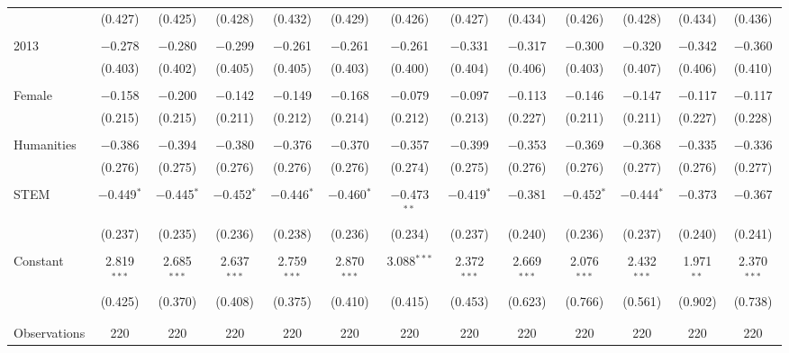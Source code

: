 \begin{subtables}
\begin{table}[H]
\begin{adjustbox}{width=\textwidth}
\begin{tabular}{@{\extracolsep{5pt}}lcccccccccccc}
  & (0.427) & (0.425) & (0.428) & (0.432) & (0.429) & (0.426) & (0.427) & (0.434) & (0.426) & (0.428) & (0.434) & (0.436) \\ 
  & & & & & & & & & & & & \\ 
 2013 & $-$0.278 & $-$0.280 & $-$0.299 & $-$0.261 & $-$0.261 & $-$0.261 & $-$0.331 & $-$0.317 & $-$0.300 & $-$0.320 & $-$0.342 & $-$0.360 \\ 
  & (0.403) & (0.402) & (0.405) & (0.405) & (0.403) & (0.400) & (0.404) & (0.406) & (0.403) & (0.407) & (0.406) & (0.410) \\ 
  & & & & & & & & & & & & \\ 
 Female & $-$0.158 & $-$0.200 & $-$0.142 & $-$0.149 & $-$0.168 & $-$0.079 & $-$0.097 & $-$0.113 & $-$0.146 & $-$0.147 & $-$0.117 & $-$0.117 \\ 
  & (0.215) & (0.215) & (0.211) & (0.212) & (0.214) & (0.212) & (0.213) & (0.227) & (0.211) & (0.211) & (0.227) & (0.228) \\ 
  & & & & & & & & & & & & \\ 
 Humanities & $-$0.386 & $-$0.394 & $-$0.380 & $-$0.376 & $-$0.370 & $-$0.357 & $-$0.399 & $-$0.353 & $-$0.369 & $-$0.368 & $-$0.335 & $-$0.336 \\ 
  & (0.276) & (0.275) & (0.276) & (0.276) & (0.276) & (0.274) & (0.275) & (0.276) & (0.276) & (0.277) & (0.276) & (0.277) \\ 
  & & & & & & & & & & & & \\ 
 STEM & $-$0.449$^{*}$ & $-$0.445$^{*}$ & $-$0.452$^{*}$ & $-$0.446$^{*}$ & $-$0.460$^{*}$ & $-$0.473$^{**}$ & $-$0.419$^{*}$ & $-$0.381 & $-$0.452$^{*}$ & $-$0.444$^{*}$ & $-$0.373 & $-$0.367 \\ 
  & (0.237) & (0.235) & (0.236) & (0.238) & (0.236) & (0.234) & (0.237) & (0.240) & (0.236) & (0.237) & (0.240) & (0.241) \\ 
  & & & & & & & & & & & & \\ 
 Constant & 2.819$^{***}$ & 2.685$^{***}$ & 2.637$^{***}$ & 2.759$^{***}$ & 2.870$^{***}$ & 3.088$^{***}$ & 2.372$^{***}$ & 2.669$^{***}$ & 2.076$^{***}$ & 2.432$^{***}$ & 1.971$^{**}$ & 2.370$^{***}$ \\ 
  & (0.425) & (0.370) & (0.408) & (0.375) & (0.410) & (0.415) & (0.453) & (0.623) & (0.766) & (0.561) & (0.902) & (0.738) \\ 
  & & & & & & & & & & & & \\ 
\hline \\[-1.8ex] 
Observations & 220 & 220 & 220 & 220 & 220 & 220 & 220 & 220 & 220 & 220 & 220 & 220 \\ 

\end{tabular}
\end{adjustbox}
\end{table}
\end{subtables}

